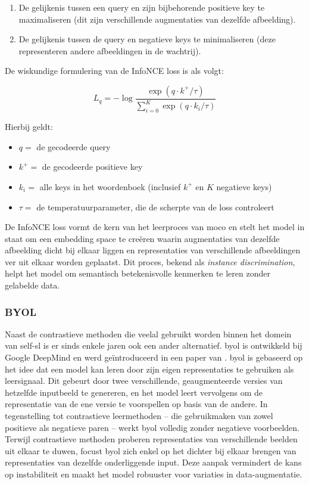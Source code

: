 \begin{enumerate}
    \item De gelijkenis tussen een query en zijn bijbehorende positieve key te maximaliseren (dit zijn verschillende augmentaties van dezelfde afbeelding).
    \item De gelijkenis tussen de query en negatieve keys te minimaliseren (deze representeren andere afbeeldingen in de wachtrij).
\end{enumerate}

De wiskundige formulering van de InfoNCE loss is als volgt:

$$
L_q = - \log \frac{\exp{(q \cdot k^+ / {\tau})}}{\sum_{i=0}^{K}\exp{(q \cdot k_i / {\tau})}}
$$

Hierbij geldt:

\begin{itemize}
    \item $q =$ de gecodeerde query
    \item $k^+ =$ de gecodeerde positieve key
    \item $k_i =$ alle keys in het woordenboek (inclusief $k^+$ en $K$ negatieve keys)
    \item $\tau =$ de temperatuurparameter, die de scherpte van de loss controleert  
\end{itemize}

De InfoNCE loss vormt de kern van het leerproces van \gls{moco} en stelt het model in staat om een embedding space te creëren waarin augmentaties van dezelfde afbeelding dicht bij elkaar liggen en representaties van verschillende afbeeldingen ver uit elkaar worden geplaatst. Dit proces, bekend als \emph{instance discrimination}, helpt het model om semantisch betekenisvolle kenmerken te leren zonder gelabelde data.

\subsubsection{BYOL}


Naast de contrastieve methoden die veelal gebruikt worden binnen het domein van \gls{self-sl} is er sinds enkele jaren ook een ander alternatief. \gls{byol} is ontwikkeld bij Google DeepMind en werd geïntroduceerd in een paper van \textcite{Grill_2020}. \gls{byol} is gebaseerd op het idee dat een model kan leren door zijn eigen representaties te gebruiken als leersignaal. Dit gebeurt door twee verschillende, geaugmenteerde versies van hetzelfde inputbeeld te genereren, en het model leert vervolgens om de representatie van de ene versie te voorspellen op basis van de andere. In tegenstelling tot contrastieve leermethoden -- die gebruikmaken van zowel positieve als negatieve paren -- werkt \gls{byol} volledig zonder negatieve voorbeelden. Terwijl contrastieve methoden proberen representaties van verschillende beelden uit elkaar te duwen, focust \gls{byol} zich enkel op het dichter bij elkaar brengen van representaties van dezelfde onderliggende input. Deze aanpak vermindert de kans op instabiliteit en maakt het model robuuster voor variaties in data-augmentatie. \\

